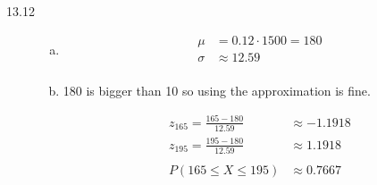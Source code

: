 \documentclass[landscape]{exam}
\begin{document}
\begin{description}
\begin{enumerate}[(a)]
      \end{enumerate}

    \item[13.12]
      \begin{enumerate}[(a)]
        \item 
          \begin{align*}
            \mu    & = 0.12 \cdot 1500 = 180 \\
            \sigma & \approx 12.59 \\
          \end{align*}

        \item
          180 is bigger than 10 so using the approximation is fine.

          \begin{align*}
            z_{165} = \frac{165 - 180}{12.59} & \approx -1.1918 \\
            z_{195} = \frac{195 - 180}{12.59} & \approx 1.1918 \\
            \\
            P(165 \leq X \leq 195)            & \approx 0.7667 \\
          \end{align*}

      \end{enumerate}


  \end{description}
\end{document}
